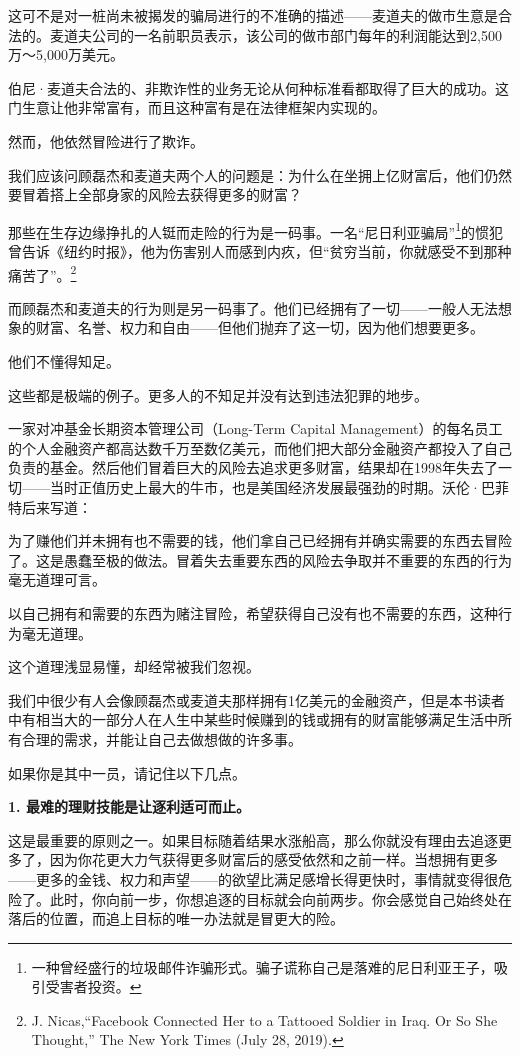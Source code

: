 这可不是对一桩尚未被揭发的骗局进行的不准确的描述——麦道夫的做市生意是合法的。麦道夫公司的一名前职员表示，该公司的做市部门每年的利润能达到2,500万～5,000万美元。

伯尼·麦道夫合法的、非欺诈性的业务无论从何种标准看都取得了巨大的成功。这门生意让他非常富有，而且这种富有是在法律框架内实现的。

然而，他依然冒险进行了欺诈。

我们应该问顾磊杰和麦道夫两个人的问题是：为什么在坐拥上亿财富后，他们仍然要冒着搭上全部身家的风险去获得更多的财富？

那些在生存边缘挣扎的人铤而走险的行为是一码事。一名“尼日利亚骗局”\footnote{一种曾经盛行的垃圾邮件诈骗形式。骗子谎称自己是落难的尼日利亚王子，吸引受害者投资。}的惯犯曾告诉《纽约时报》，他为伤害别人而感到内疚，但“贫穷当前，你就感受不到那种痛苦了”。\footnote{J. Nicas,“Facebook Connected Her to a Tattooed Soldier in Iraq. Or So She Thought,” The New York Times (July 28, 2019).}

而顾磊杰和麦道夫的行为则是另一码事了。他们已经拥有了一切——一般人无法想象的财富、名誉、权力和自由——但他们抛弃了这一切，因为他们想要更多。

他们不懂得知足。

这些都是极端的例子。更多人的不知足并没有达到违法犯罪的地步。

一家对冲基金长期资本管理公司（Long-Term Capital Management）的每名员工的个人金融资产都高达数千万至数亿美元，而他们把大部分金融资产都投入了自己负责的基金。然后他们冒着巨大的风险去追求更多财富，结果却在1998年失去了一切——当时正值历史上最大的牛市，也是美国经济发展最强劲的时期。沃伦·巴菲特后来写道：

{\kaishu

为了赚他们并未拥有也不需要的钱，他们拿自己已经拥有并确实需要的东西去冒险了。这是愚蠢至极的做法。冒着失去重要东西的风险去争取并不重要的东西的行为毫无道理可言。

}

以自己拥有和需要的东西为赌注冒险，希望获得自己没有也不需要的东西，这种行为毫无道理。

这个道理浅显易懂，却经常被我们忽视。

我们中很少有人会像顾磊杰或麦道夫那样拥有1亿美元的金融资产，但是本书读者中有相当大的一部分人在人生中某些时候赚到的钱或拥有的财富能够满足生活中所有合理的需求，并能让自己去做想做的许多事。

如果你是其中一员，请记住以下几点。

\textbf{1. 最难的理财技能是让逐利适可而止。}

这是最重要的原则之一。如果目标随着结果水涨船高，那么你就没有理由去追逐更多了，因为你花更大力气获得更多财富后的感受依然和之前一样。当想拥有更多——更多的金钱、权力和声望——的欲望比满足感增长得更快时，事情就变得很危险了。此时，你向前一步，你想追逐的目标就会向前两步。你会感觉自己始终处在落后的位置，而追上目标的唯一办法就是冒更大的险。

